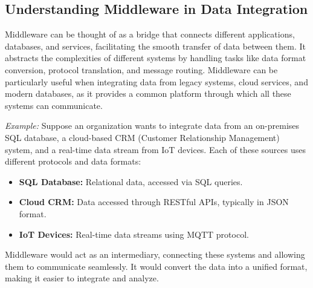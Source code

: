 \documentclass[12pt]{article}
\begin{document}
\subsection{Understanding Middleware in Data Integration}
Middleware can be thought of as a bridge that connects different applications, databases, and services, facilitating the smooth transfer of data between them. It abstracts the complexities of different systems by handling tasks like data format conversion, protocol translation, and message routing. Middleware can be particularly useful when integrating data from legacy systems, cloud services, and modern databases, as it provides a common platform through which all these systems can communicate.

\textit{Example:} Suppose an organization wants to integrate data from an on-premises SQL database, a cloud-based CRM (Customer Relationship Management) system, and a real-time data stream from IoT devices. Each of these sources uses different protocols and data formats:
\begin{itemize}
    \item \textbf{SQL Database:} Relational data, accessed via SQL queries.
    \item \textbf{Cloud CRM:} Data accessed through RESTful APIs, typically in JSON format.
    \item \textbf{IoT Devices:} Real-time data streams using MQTT protocol.
\end{itemize}
Middleware would act as an intermediary, connecting these systems and allowing them to communicate seamlessly. It would convert the data into a unified format, making it easier to integrate and analyze.
\end{document}
